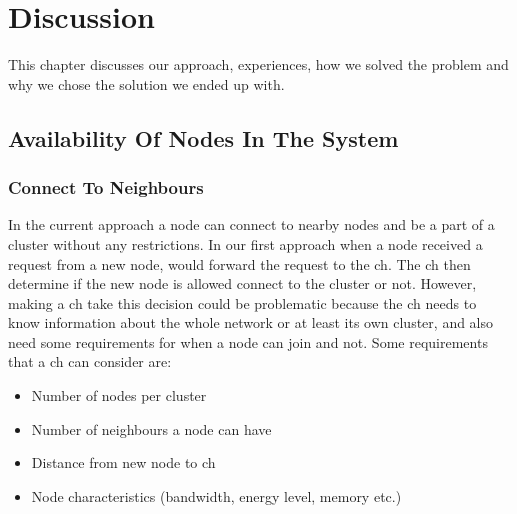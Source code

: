 \documentclass[USenglish]{uit-thesis}
\begin{document}
\chapter{Discussion}
\glsresetall

This chapter discusses our approach, experiences, how we solved the problem and why we chose the solution we ended up with.

\section{Availability Of Nodes In The System} \label{disc:node_conn}

\subsection{Connect To Neighbours} \label{disc:conn_neighbours}


In the current approach a node can connect to nearby nodes and be a part of a cluster without any restrictions. In our first approach when a node received a request from a new node, would forward the request to the \gls{ch}. The \gls{ch} then determine if the new node is allowed connect to the cluster or not. However, making a \gls{ch} take this decision could be problematic because the \gls{ch} needs to know information about the whole network or at least its own cluster, and also need some requirements for when a node can join and not. Some requirements that a \gls{ch} can consider are:

\begin{itemize}
\item Number of nodes per cluster
\item Number of neighbours a node can have
\item Distance from new node to \gls{ch}
\item Node characteristics (bandwidth, energy level, memory etc.)
\end{itemize}
\end{document}
